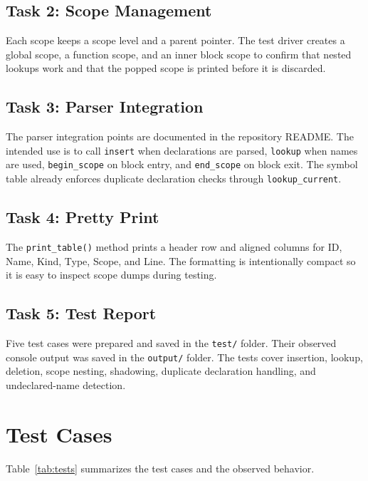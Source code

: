 \documentclass[11pt]{article}
\begin{document}
\subsection{Task 2: Scope Management}
Each scope keeps a scope level and a parent pointer. The test driver creates a global scope, a function scope, and an inner block scope to confirm that nested lookups work and that the popped scope is printed before it is discarded.

\subsection{Task 3: Parser Integration}
The parser integration points are documented in the repository README. The intended use is to call \texttt{insert} when declarations are parsed, \texttt{lookup} when names are used, \texttt{begin\_scope} on block entry, and \texttt{end\_scope} on block exit. The symbol table already enforces duplicate declaration checks through \texttt{lookup\_current}.

\subsection{Task 4: Pretty Print}
The \texttt{print\_table()} method prints a header row and aligned columns for ID, Name, Kind, Type, Scope, and Line. The formatting is intentionally compact so it is easy to inspect scope dumps during testing.

\subsection{Task 5: Test Report}
Five test cases were prepared and saved in the \texttt{test/} folder. Their observed console output was saved in the \texttt{output/} folder. The tests cover insertion, lookup, deletion, scope nesting, shadowing, duplicate declaration handling, and undeclared-name detection.

\section{Test Cases}
Table~\ref{tab:tests} summarizes the test cases and the observed behavior.
\end{document}
